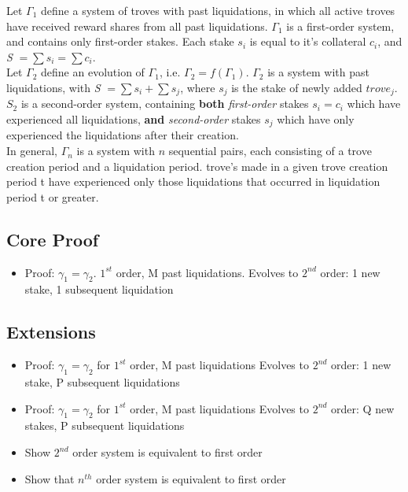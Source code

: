 \documentclass[reqno]{article}
\begin{document}
\bigskip
Let $\Gamma_1$ define a system of troves with past liquidations, in which all active troves have received reward shares from all past liquidations. $\Gamma_1$ is a first-order system, and contains only first-order stakes. Each stake $s_i$ is equal to it’s collateral $c_i$, and \textit{S} $= \sum s_i = \sum c_i$.\\

Let $\Gamma_2$ define an evolution of $\Gamma_1$, i.e. $\Gamma_2 = f(\Gamma_1)$. $\Gamma_2$ is a system with past liquidations, with \textit{S} $= \sum s_i + \sum s_j$, where $s_j$ is the stake of newly added $trove_j$. $S_2$ is a second-order system, containing \textbf{both} \textit{first-order} stakes $s_i = c_i$ which have experienced all liquidations, \textbf{and} \textit{second-order} stakes $s_j$ which have only experienced the liquidations after their creation.\\

In general, $\Gamma_n$ is a system with $n$ sequential pairs, each consisting of a trove creation period and a liquidation period. trove's made in a given trove creation period t have experienced only those liquidations that occurred in liquidation period t or greater.


\subsection*{Core Proof}
\begin{itemize}
  \item Proof: $\gamma_1=\gamma_2$. $1^{st}$ order, M past liquidations. Evolves to $2^{nd}$ order: 1 new stake, 1 subsequent liquidation
\end{itemize}


\subsection*{Extensions}
\begin{itemize}
  \item Proof: $\gamma_1=\gamma_2$ for $1^{st}$ order, M past liquidations Evolves to $2^{nd}$ order: 1 new stake, P subsequent liquidations
  \item Proof: $\gamma_1=\gamma_2$ for $1^{st}$ order, M past liquidations Evolves to $2^{nd}$ order: Q new stakes, P subsequent liquidations
  \item Show $2^{nd}$ order system is equivalent to first order 
  \item Show that $n^{th}$ order system is equivalent to first order
\end{itemize}
\end{document}
